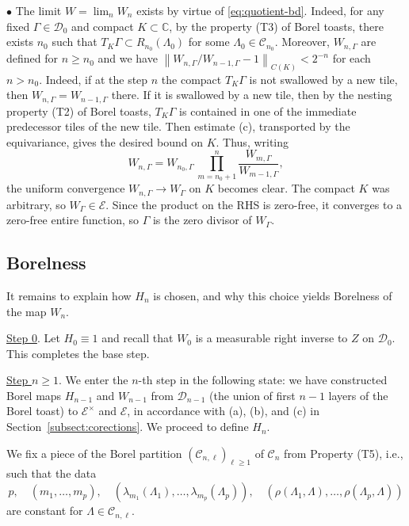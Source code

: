 \documentclass[11pt]{paper}
\newcommand{\bC}{\mathbb C}
\newcommand{\cE}{\mathcal E}
\newcommand{\cD}{\mathcal D}
\newcommand{\cC}{\mathcal C}
\begin{document}
\medskip

\noindent $\bullet$\;\; The limit $W= \lim_{n}W_n$ exists by virtue of \eqref{eq:quotient-bd}.
Indeed, for any fixed $\Gamma\in \cD_0$ and compact $K\subset\bC$, by the property (T3) of Borel
toasts, there exists $n_0$ such that $T_K\Gamma\subset R_{n_0}(\Lambda_0)$ for some
$\Lambda_0\in \cC_{n_0}$.  Moreover, $W_{n,\Gamma}$ are defined for $n\ge n_0$ and we have
$\left\lVert W_{n,\Gamma}/W_{n-1,\Gamma}-1\right\rVert_{C(K)}< 2^{-n}$ for each $n> n_0$.
Indeed,
if at the step $n$ the compact $T_K\Gamma$ is not swallowed by a new tile, then
$W_{n, \Gamma} = W_{n-1, \Gamma}$ there. If it is swallowed by a new tile, then by the nesting
property (T2) of Borel toasts, $T_K\Gamma$ is contained in one of the immediate predecessor tiles of
the new tile. Then estimate (c), transported by the equivariance, gives the desired bound on
$K$. Thus, writing
\[
W_{n,\Gamma} =
W_{n_0,\Gamma}\,\prod_{m=n_0+1}^{n}\frac{W_{m,\Gamma}}{W_{m-1,\Gamma}},
\]
the uniform convergence $W_{n,\Gamma}\to W_\Gamma$ on $K$ becomes clear.
The compact $K$ was arbitrary, so $W_\Gamma\in\cE$. Since the product on the RHS is zero-free,
it converges to a zero-free entire function, so $\Gamma$ is the zero divisor of $W_\Gamma$.


\subsection{Borelness}
It remains to explain how $H_{n}$ is chosen, and why this choice yields
Borelness of the map $W_n$.

\medskip

\noindent\underline{Step 0}.  Let $H_0\equiv 1$ and recall that $W_0$ is a measurable
right inverse to $Z$ on $\cD_0$. This completes the base step.


\medskip

\noindent \underline{Step $n\ge 1$}. We enter the $n$-th step in the following state:
we have constructed Borel maps $H_{n-1}$ and $W_{n-1}$
from $\cD_{n-1}$ (the union of first $n-1$ layers of the Borel toast)  to
$\cE^\times$ and $\cE$, in accordance
with (a), (b), and (c) in Section~\ref{subsect:corections}.
We proceed to define $H_n$.

\smallskip

We fix a piece of the Borel partition $(\cC_{n,\ell})_{\ell\ge 1}$ of $\cC_n$
from Property (T5), i.e., such that the data
\[
p, \quad (m_1, \dots , m_p), \quad (\lambda_{m_1}(\Lambda_1),\ldots,\lambda_{m_p}(\Lambda_p)), \quad
(\rho(\Lambda_1, \Lambda), \ldots, \rho(\Lambda_p, \Lambda))
\]
are constant for $\Lambda\in \cC_{n,\ell}$.
\end{document}
